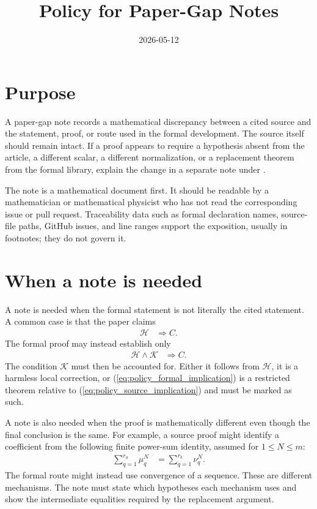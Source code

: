 \documentclass{article}
\title{Policy for Paper-Gap Notes}
\author{}
\date{2026-05-12}
\begin{document}
\maketitle

\section{Purpose}

A paper-gap note records a mathematical discrepancy between a cited source and
the statement, proof, or route used in the formal development. The source
itself should remain intact. If a proof appears to require a hypothesis absent
from the article, a different scalar, a different normalization, or a
replacement theorem from the formal library, explain the change in a separate
note under .

The note is a mathematical document first. It should be readable by a
mathematician or mathematical physicist who has not read the corresponding
issue or pull request. Traceability data such as formal declaration names,
source-file paths, GitHub issues, and line ranges support the exposition,
usually in footnotes; they do not govern it.

\section{When a note is needed}

A note is needed when the formal statement is not literally the cited
statement. A common case is that the paper claims
\begin{align}
    \mathcal H &\Longrightarrow C.
    \label{eq:policy_source_implication}
\end{align}
The formal proof may instead establish only
\begin{align}
    \mathcal H\wedge\mathcal K &\Longrightarrow C.
    \label{eq:policy_formal_implication}
\end{align}
The condition $\mathcal K$ must then be accounted for. Either it follows from
$\mathcal H$, it is a harmless local correction, or
(\ref{eq:policy_formal_implication}) is a restricted theorem relative to
(\ref{eq:policy_source_implication}) and must be marked as such.

A note is also needed when the proof is mathematically different even though
the final conclusion is the same. For example, a source proof might identify a
coefficient from the following finite power-sum identity, assumed for
$1\leq N\leq m$:
\begin{align}
    \sum_{q=1}^{r_a}\mu_q^N
        &= \sum_{q=1}^{r_b}\nu_q^N.
    \label{eq:policy_power_sum}
\end{align}
The formal route might instead use convergence of a sequence. These are
different mechanisms. The note must state which hypotheses each mechanism uses
and show the intermediate equalities required by the replacement argument.
\end{document}
